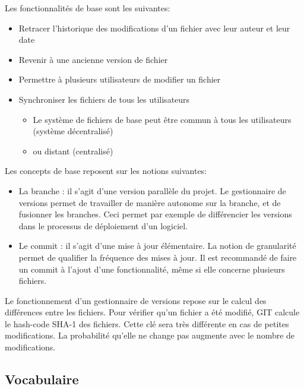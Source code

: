 Les fonctionnalités de base sont les suivantes:
\begin{itemize}
\item Retracer l'historique des modifications d'un fichier avec leur auteur et leur date
\item Revenir à une ancienne version de fichier
\item Permettre à plusieurs utilisateurs de modifier un fichier
\item Synchroniser les fichiers de tous les utilisateurs
\begin{itemize}
\item Le système de fichiers de base peut être commun à tous les utilisateurs (système décentralisé)
\item ou distant (centralisé)
\end{itemize}
\end{itemize}

Les concepts de base reposent sur les notions suivantes:
\begin{itemize}
\item La branche : il s'agit d'une version parallèle du projet. Le gestionnaire de versions permet de travailler de manière autonome sur la branche, et de fusionner les branches. Ceci permet par exemple de différencier les versions dans le processus de déploiement d'un logiciel. 
\item Le commit : il s'agit d'une mise à jour élémentaire. La notion de granularité permet de qualifier la fréquence des mises à jour. Il est recommandé de faire un commit à l'ajout d'une fonctionnalité, même si elle concerne plusieurs fichiers. 
\end{itemize}

Le fonctionnement d'un gestionnaire de versions repose sur le calcul des différences entre les fichiers. Pour vérifier qu'un fichier a été modifié, GIT calcule le hash-code SHA-1 des fichiers. Cette clé sera très différente en cas de petites modifications. La probabilité qu'elle ne change pas augmente avec le nombre de modifications. 



\subsection{Vocabulaire}

